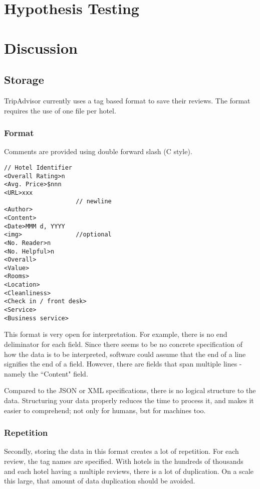 \documentclass[a4paper]{article}
\begin{document}
\newpage
\section{Hypothesis Testing}


\newpage
\section{Discussion}

\subsection{Storage}
TripAdvisor currently uses a tag based format to save their reviews.
The format requires the use of one file per hotel.

\subsubsection{Format}
Comments are provided using double forward slash (C style).
\begin{lstlisting}[language={}]
// Hotel Identifier
<Overall Rating>n
<Avg. Price>$nnn
<URL>xxx
					// newline
<Author>
<Content>
<Date>MMM d, YYYY
<img>				//optional
<No. Reader>n
<No. Helpful>n
<Overall>
<Value>
<Rooms>
<Location>
<Cleanliness>
<Check in / front desk>
<Service>
<Business service>
\end{lstlisting}
This format is very open for interpretation.
For example, there is no end deliminator for each field.
Since there seems to be no concrete specification of how the data is to be interpreted, software could assume that the end of a line signifies the end of a field.
However, there are fields that span multiple lines - namely the ``Content" field.

Compared to the JSON or XML specifications, there is no logical structure to the data.
Structuring your data properly reduces the time to process it, and makes it easier to comprehend; not only for humans, but for machines too.

\subsubsection{Repetition}
Secondly, storing the data in this format creates a lot of repetition.
For each review, the tag names are specified.
With hotels in the hundreds of thousands and each hotel having a multiple reviews, there is a lot of duplication.
On a scale this large, that amount of data duplication should be avoided.
\end{document}
